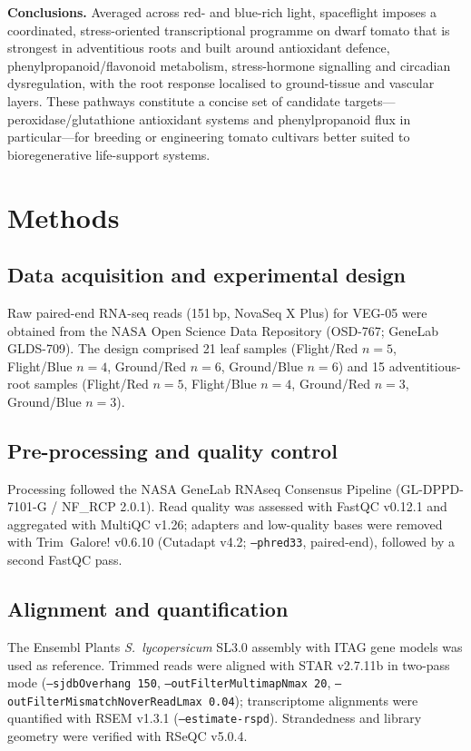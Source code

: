 \documentclass[10pt,twocolumn]{article}
\begin{document}
\textbf{Conclusions.} Averaged across red- and blue-rich light, spaceflight imposes a
coordinated, stress-oriented transcriptional programme on dwarf tomato that is
strongest in adventitious roots and built around antioxidant defence,
phenylpropanoid/flavonoid metabolism, stress-hormone signalling and circadian
dysregulation, with the root response localised to ground-tissue and vascular layers.
These pathways constitute a concise set of candidate targets---peroxidase/glutathione
antioxidant systems and phenylpropanoid flux in particular---for breeding or
engineering tomato cultivars better suited to bioregenerative life-support systems.

\section{Methods}
\subsection{Data acquisition and experimental design}
Raw paired-end RNA-seq reads (151\,bp, NovaSeq X Plus) for VEG-05 were obtained from
the NASA Open Science Data Repository (OSD-767; GeneLab GLDS-709). The design comprised
21 leaf samples (Flight/Red $n{=}5$, Flight/Blue $n{=}4$, Ground/Red $n{=}6$,
Ground/Blue $n{=}6$) and 15 adventitious-root samples (Flight/Red $n{=}5$, Flight/Blue
$n{=}4$, Ground/Red $n{=}3$, Ground/Blue $n{=}3$).

\subsection{Pre-processing and quality control}
Processing followed the NASA GeneLab RNAseq Consensus Pipeline (GL-DPPD-7101-G /
NF\_RCP 2.0.1). Read quality was assessed with FastQC v0.12.1 and aggregated with
MultiQC v1.26; adapters and low-quality bases were removed with Trim~Galore! v0.6.10
(Cutadapt v4.2; \texttt{--phred33}, paired-end), followed by a second FastQC pass.

\subsection{Alignment and quantification}
The Ensembl Plants \textit{S.\ lycopersicum} SL3.0 assembly with ITAG gene models was
used as reference. Trimmed reads were aligned with STAR\cite{star} v2.7.11b in two-pass mode
(\texttt{--sjdbOverhang 150}, \texttt{--outFilterMultimapNmax 20},
\texttt{--outFilterMismatchNoverReadLmax 0.04}); transcriptome alignments were
quantified with RSEM\cite{rsem} v1.3.1 (\texttt{--estimate-rspd}). Strandedness and library
geometry were verified with RSeQC v5.0.4.
\end{document}
